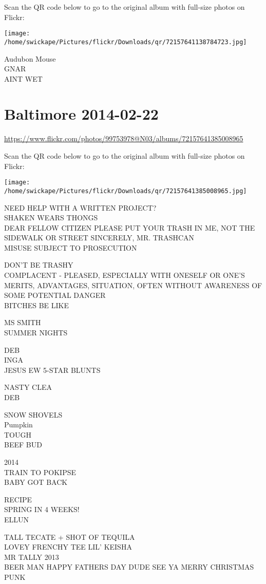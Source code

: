 \documentclass[10pt,letterpaper]{article}
\begin{document}
Scan the QR code below to go to the original album with full-size photos on Flickr:

\texttt{[image: /home/swickape/Pictures/flickr/Downloads/qr/72157641138784723.jpg]}
\pagebreak

Audubon Mouse\\
GNAR\\
AINT WET
\pagebreak

\section*{Baltimore 2014-02-22}

\url{https://www.flickr.com/photos/99753978@N03/albums/72157641385008965}

Scan the QR code below to go to the original album with full-size photos on Flickr:

\texttt{[image: /home/swickape/Pictures/flickr/Downloads/qr/72157641385008965.jpg]}
\pagebreak

NEED HELP WITH A WRITTEN PROJECT?\\
SHAKEN WEARS THONGS\\
DEAR FELLOW CITIZEN PLEASE PUT YOUR TRASH IN ME, NOT THE SIDEWALK OR STREET SINCERELY, MR. TRASHCAN\\
MISUSE SUBJECT TO PROSECUTION

DON'T BE TRASHY\\
COMPLACENT {-} PLEASED, ESPECIALLY WITH ONESELF OR ONE'S MERITS, ADVANTAGES, SITUATION, OFTEN WITHOUT AWARENESS OF SOME POTENTIAL DANGER\\
BITCHES BE LIKE

MS SMITH\\
SUMMER NIGHTS

DEB\\
INGA\\
JESUS EW 5{-}STAR BLUNTS

NASTY CLEA\\
DEB

SNOW SHOVELS\\
Pumpkin\\
TOUGH\\
BEEF BUD

2014\\
TRAIN TO POKIPSE\\
BABY GOT BACK

RECIPE\\
SPRING IN 4 WEEKS!\\
ELLUN

TALL TECATE + SHOT OF TEQUILA\\
LOVEY FRENCHY TEE LIL' KEISHA\\
MR TALLY 2013\\
BEER MAN HAPPY FATHERS DAY DUDE SEE YA MERRY CHRISTMAS PUNK
\end{document}
